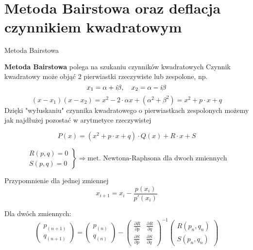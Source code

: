 \section{Metoda Bairstowa oraz deflacja czynnikiem kwadratowym}

\begin{frame}{Metoda Bairstowa}

  \vspace{5px}

  \textbf{Metoda Bairstowa} polega na szukaniu czynników kwadratowych
Czynnik kwadratowy może objąć 2 pierwiastki rzeczywiste lub zespolone, np.
  $$x_1 = \alpha + \textit{\textrm{i}}\beta, \quad x_2 = \alpha - \textit{\textrm{i}}\beta$$
  $$(x - x_1)(x - x_2) = x^2 - 2 \cdot \alpha x + (\alpha^2 + \beta^2) = x^2 + p \cdot x + q$$
Dzięki "wyłuskaniu" czynnika kwadratowego o pierwiastkach zespolonych możemy jak najdłużej pozostać w arytmetyce rzeczywistej
  

  \begin{equation}
    P(x) = (x^2 + p \cdot x + q) \cdot Q(x) + R \cdot x + S \label{bairstow}
  \end{equation}
\end{frame}

\begin{frame}
  $$\left. \begin{array}{l}
  R(p,q)=0 \\ S(p,q)=0
  \end{array}\right\} \Rightarrow \text{met. Newtona-Raphsona dla dwoch zmiennych}$$
  
  Przypomnienie dla jednej zmiennej
  $$x_{i+1}=x_i-\frac{p(x_i)}{p'(x_i)}$$

  \vspace{5mm}
 Dla dwóch zmiennych:
  $$\left( \begin{array}{l}
  p_{(n+1)} \\ q_{(n+1)}
  \end{array} \right)
  =
  \left( \begin{array}{l}
  p_{(n)} \\ q_{(n)}
  \end{array} \right)
  -
  \left( \begin{array}{ll}
  \frac{{\partial}R}{{\partial}p} & \frac{{\partial}R}{{\partial}q} \\
  \frac{{\partial}S}{{\partial}p} & \frac{{\partial}S}{{\partial}q}
  \end{array} \right)^{-1}
  \left( \begin{array}{l}
  R(p_n,q_n) \\ S(p_n,q_n)
  \end{array} \right)$$
\end{frame}

